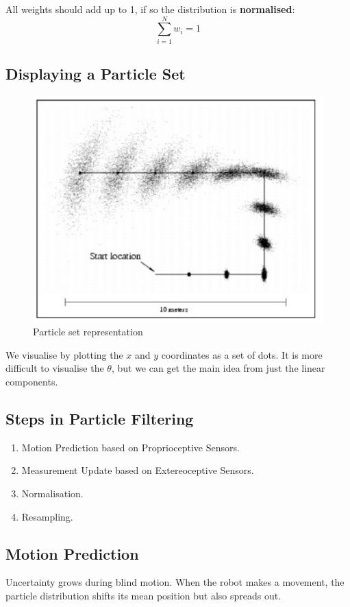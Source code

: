 \documentclass[11pt]{article}
\begin{document}
All weights should add up to 1, if so the distribution is \textbf{normalised}:
\[
  \sum_{i = 1}^N w_i = 1
\]

\subsection{Displaying a Particle Set}
\begin{figure}[h]
  \caption{Particle set representation}
  \includegraphics[scale=0.4]{particleset}
  \centering
\end{figure}

We visualise by plotting the $x$ and $y$ coordinates as a set of dots.
It is more difficult to visualise the $\theta$, but we can get the main idea from just the linear components.

\subsection{Steps in Particle Filtering}
\begin{enumerate}
  \item Motion Prediction based on Proprioceptive Sensors.
  \item Measurement Update based on Extereoceptive Sensors.
  \item Normalisation.
  \item Resampling.
\end{enumerate}

\subsection{Motion Prediction}
Uncertainty grows during blind motion.
When the robot makes a movement, the particle distribution shifts its mean position but also spreads out.
\end{document}
